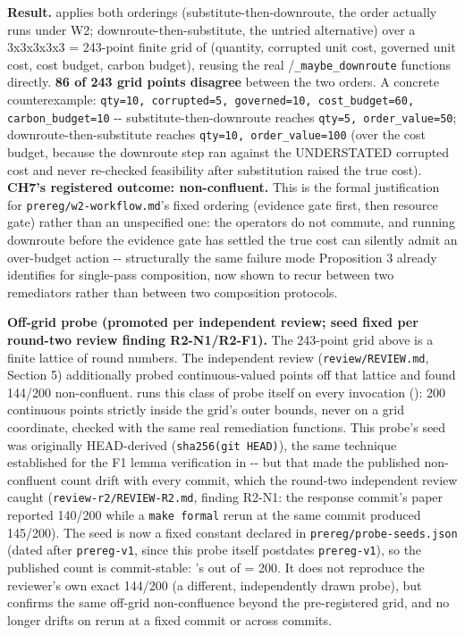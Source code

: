 \documentclass[11pt,a4paper]{article}
\theoremstyle{definition}
\begin{document}
\noindent\textbf{Result.}  applies both orderings (substitute-then-downroute, the order  actually runs under W2; downroute-then-substitute, the untried alternative) over a 3x3x3x3x3 = 243-point finite grid of (quantity, corrupted unit cost, governed unit cost, cost budget, carbon budget), reusing the real /\texttt{\_maybe\_downroute} functions directly. \textbf{86 of 243 grid points disagree} between the two orders. A concrete counterexample: \texttt{qty=10, corrupted=5, governed=10, cost\_budget=60, carbon\_budget=10} -{}- substitute-then-downroute reaches \texttt{qty=5, order\_value=50}; downroute-then-substitute reaches \texttt{qty=10, order\_value=100} (over the cost budget, because the downroute step ran against the UNDERSTATED corrupted cost and never re-checked feasibility after substitution raised the true cost). \textbf{CH7's registered outcome: non-confluent.} This is the formal justification for \texttt{prereg/w2-workflow.md}'s fixed ordering (evidence gate first, then resource gate) rather than an unspecified one: the operators do not commute, and running downroute before the evidence gate has settled the true cost can silently admit an over-budget action -{}- structurally the same failure mode Proposition 3 already identifies for single-pass composition, now shown to recur between two remediators rather than between two composition protocols.

\noindent\textbf{Off-grid probe (promoted per independent review; seed fixed per round-two review finding R2-N1/R2-F1).} The 243-point grid above is a finite lattice of round numbers. The independent review (\texttt{review/REVIEW.md}, Section 5) additionally probed continuous-valued points off that lattice and found 144/200 non-confluent.  runs this class of probe itself on every invocation (): 200 continuous points strictly inside the grid's outer bounds, never on a grid coordinate, checked with the same real remediation functions. This probe's seed was originally HEAD-derived (\texttt{sha256(git HEAD)}), the same technique established for the F1 lemma verification in  -{}- but that made the published non-confluent count drift with every commit, which the round-two independent review caught (\texttt{review-r2/REVIEW-R2.md}, finding R2-N1: the response commit's paper reported 140/200 while a \texttt{make formal} rerun at the same commit produced 145/200). The seed is now a fixed constant declared in \texttt{prereg/probe-seeds.json} (dated after \texttt{prereg-v1}, since this probe itself postdates \texttt{prereg-v1}), so the published count is commit-stable: 's  out of  = 200. It does not reproduce the reviewer's own exact 144/200 (a different, independently drawn probe), but confirms the same off-grid non-confluence beyond the pre-registered grid, and no longer drifts on rerun at a fixed commit or across commits.
\end{document}
